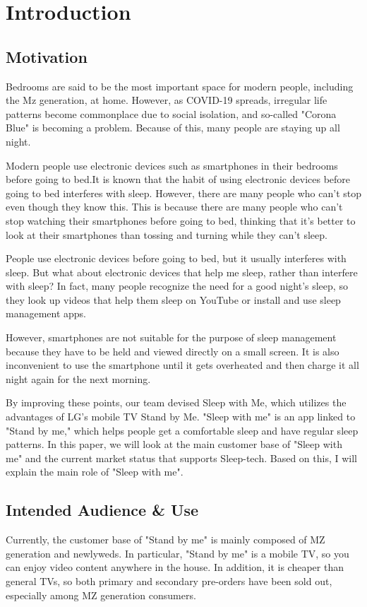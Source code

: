 \documentclass[conference]{IEEEtran}
\begin{document}
\section{Introduction}
\vspace{1\baselineskip}
\subsection{Motivation}
Bedrooms are said to be the most important space for modern people, including the Mz generation, at home. However, as COVID-19 spreads, irregular life patterns become commonplace due to social isolation, and so-called "Corona Blue" is becoming a problem. Because of this, many people are staying up all night.

Modern people use electronic devices such as smartphones in their bedrooms before going to bed.It is known that the habit of using electronic devices before going to bed interferes with sleep. However, there are many people who can't stop even though they know this. This is because there are many people who can't stop watching their smartphones before going to bed, thinking that it's better to look at their smartphones than tossing and turning while they can't sleep.

People use electronic devices before going to bed, but it usually interferes with sleep. But what about electronic devices that help me sleep, rather than interfere with sleep? In fact, many people recognize the need for a good night's sleep, so they look up videos that help them sleep on YouTube or install and use sleep management apps.

However, smartphones are not suitable for the purpose of sleep management because they have to be held and viewed directly on a small screen. It is also inconvenient to use the smartphone until it gets overheated and then charge it all night again for the next morning.

By improving these points, our team devised Sleep with Me, which utilizes the advantages of LG's mobile TV Stand by Me. "Sleep with me" is an app linked to "Stand by me," which helps people get a comfortable sleep and have regular sleep patterns. In this paper, we will look at the main customer base of "Sleep with me" and the current market status that supports Sleep-tech. Based on this, I will explain the main role of "Sleep with me".
\vspace{1\baselineskip}
\subsection{Intended Audience \& Use}
Currently, the customer base of "Stand by me" is mainly composed of MZ generation and newlyweds. In particular, "Stand by me" is a mobile TV, so you can enjoy video content anywhere in the house. In addition, it is cheaper than general TVs, so both primary and secondary pre-orders have been sold out, especially among MZ generation consumers.
\end{document}

